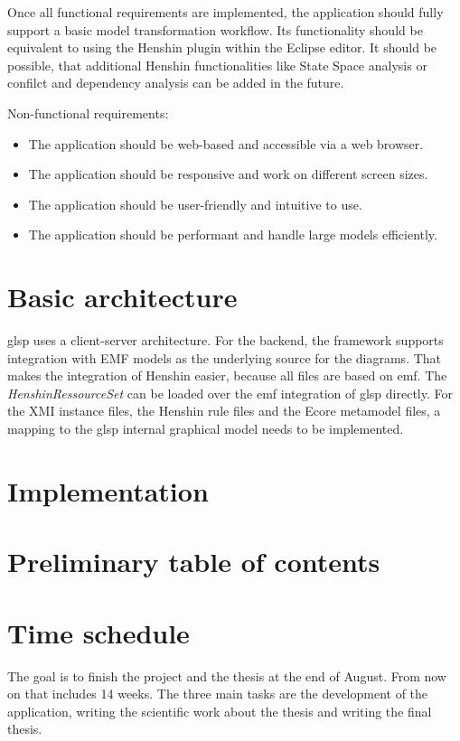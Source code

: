 \documentclass[conference,onecolumn]{IEEEtran}
\begin{document}
  Once all functional requirements are implemented, the application should fully support a basic model transformation workflow. Its functionality should be equivalent to using the Henshin plugin within the Eclipse editor. It should be possible, that additional Henshin functionalities like State Space analysis or confilct and dependency analysis can be added in the future.


  Non-functional requirements:

  \begin{itemize}
    \item The application should be web-based and accessible via a web browser.
    \item The application should be responsive and work on different screen sizes.
    \item The application should be user-friendly and intuitive to use.
    \item The application should be performant and handle large models efficiently.
\end{itemize}

  \section{Basic architecture}
  \label{subsec:architecture}

  \ac{glsp} uses a client-server architecture. For the backend, the framework supports integration with EMF models as the underlying source for the diagrams. That makes the integration of Henshin easier, because all files are based on \ac{emf}. The \textit{HenshinRessourceSet} can be loaded over the \ac{emf} integration of \ac{glsp} directly. For the XMI instance files, the Henshin rule files and the Ecore metamodel files, a mapping to the \ac{glsp} internal graphical model needs to be implemented. \cite{eclipseGLSP}
    
  \section{Implementation}
  \label{subsec:implementation}

  \section{Preliminary table of contents}

  

  \section{Time schedule}
  The goal is to finish the project and the thesis at the end of August. From now on that includes 14 weeks. The three main tasks are the development of the application, writing the scientific work about the thesis and writing the final thesis.
\end{document}

